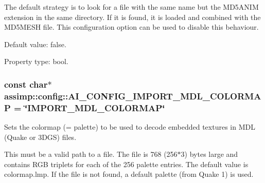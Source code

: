 The default strategy is to look for a file with the same name but the M\+D5\+A\+N\+I\+M extension in the same directory. If it is found, it is loaded and combined with the M\+D5\+M\+E\+S\+H file. This configuration option can be used to disable this behaviour.

Default value\+: false.

Property type\+: bool. \hypertarget{namespaceassimp_1_1config_ae00ce5c9571b1e7bc0de75a4da893839}{
\subsubsection[{A\+I\+\_\+\+C\+O\+N\+F\+I\+G\+\_\+\+I\+M\+P\+O\+R\+T\+\_\+\+M\+D\+L\+\_\+\+C\+O\+L\+O\+R\+M\+A\+P}]{\setlength{\rightskip}{0pt plus 5cm}const char$\ast$ assimp\+::config\+::\+A\+I\+\_\+\+C\+O\+N\+F\+I\+G\+\_\+\+I\+M\+P\+O\+R\+T\+\_\+\+M\+D\+L\+\_\+\+C\+O\+L\+O\+R\+M\+A\+P = \char`\"{}I\+M\+P\+O\+R\+T\+\_\+\+M\+D\+L\+\_\+\+C\+O\+L\+O\+R\+M\+A\+P\char`\"{}}}\label{namespaceassimp_1_1config_ae00ce5c9571b1e7bc0de75a4da893839}
Sets the colormap (= palette) to be used to decode embedded textures in M\+D\+L (Quake or 3\+D\+G\+S) files.

This must be a valid path to a file. The file is 768 (256$\ast$3) bytes large and contains R\+G\+B triplets for each of the 256 palette entries. The default value is colormap.\+lmp. If the file is not found, a default palette (from Quake 1) is used.

